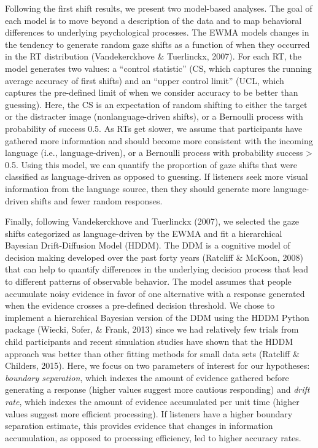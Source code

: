 \documentclass[,man,floatsintext]{apa6}
\begin{document}
Following the first shift results, we present two model-based analyses.
The goal of each model is to move beyond a description of the data and
to map behavioral differences to underlying psychological processes. The
EWMA models changes in the tendency to generate random gaze shifts as a
function of when they occurred in the RT distribution (Vandekerckhove \&
Tuerlinckx, 2007). For each RT, the model generates two values: a
\enquote{control statistic} (CS, which captures the running average
accuracy of first shifts) and an \enquote{upper control limit} (UCL,
which captures the pre-defined limit of when we consider accuracy to be
better than guessing). Here, the CS is an expectation of random shifting
to either the target or the distracter image (nonlanguage-driven
shifts), or a Bernoulli process with probability of success 0.5. As RTs
get slower, we assume that participants have gathered more information
and should become more consistent with the incoming language (i.e.,
language-driven), or a Bernoulli process with probability success
\textgreater{} 0.5. Using this model, we can quantify the proportion of
gaze shifts that were classified as language-driven as opposed to
guessing. If listeners seek more visual information from the language
source, then they should generate more language-driven shifts and fewer
random responses.

Finally, following Vandekerckhove and Tuerlinckx (2007), we selected the
gaze shifts categorized as language-driven by the EWMA and fit a
hierarchical Bayesian Drift-Diffusion Model (HDDM). The DDM is a
cognitive model of decision making developed over the past forty years
(Ratcliff \& McKoon, 2008) that can help to quantify differences in the
underlying decision process that lead to different patterns of
observable behavior. The model assumes that people accumulate noisy
evidence in favor of one alternative with a response generated when the
evidence crosses a pre-defined decision threshold. We chose to implement
a hierarchical Bayesian version of the DDM using the HDDM Python package
(Wiecki, Sofer, \& Frank, 2013) since we had relatively few trials from
child participants and recent simulation studies have shown that the
HDDM approach was better than other fitting methods for small data sets
(Ratcliff \& Childers, 2015). Here, we focus on two parameters of
interest for our hypotheses: \emph{boundary separation}, which indexes
the amount of evidence gathered before generating a response (higher
values suggest more cautious responding) and \emph{drift rate}, which
indexes the amount of evidence accumulated per unit time (higher values
suggest more efficient processing). If listeners have a higher boundary
separation estimate, this provides evidence that changes in information
accumulation, as opposed to processing efficiency, led to higher
accuracy rates.
\end{document}
